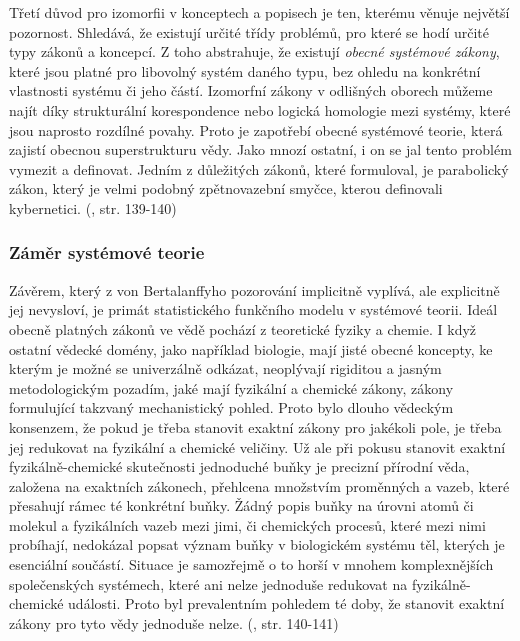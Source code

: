 \documentclass[11pt,a4paper]{article}
\begin{document}
Třetí důvod pro izomorfii v konceptech a popisech je ten, kterému věnuje největší pozornost. Shledává, že existují určité třídy problémů, pro které se hodí určité typy zákonů a koncepcí. Z toho abstrahuje, že existují \textit{obecné systémové zákony}, které jsou platné pro libovolný systém daného typu, bez ohledu na konkrétní vlastnosti systému či jeho částí. Izomorfní zákony v odlišných oborech můžeme najít díky strukturální korespondence nebo logická homologie mezi systémy, které jsou naprosto rozdílné povahy. Proto je zapotřebí obecné systémové teorie, která zajistí obecnou superstrukturu vědy. Jako mnozí ostatní, i on se jal tento problém vymezit a definovat. Jedním z důležitých zákonů, které formuloval, je parabolický zákon, který je velmi podobný zpětnovazební smyčce, kterou definovali kybernetici. (\cite{von_bertalanffy_outline_1950}, str. 139-140)


\subsubsection{Záměr systémové teorie}

Závěrem, který z von Bertalanffyho pozorování implicitně vyplívá, ale explicitně jej nevysloví, je primát statistického funkčního modelu v systémové teorii. Ideál obecně platných zákonů ve vědě pochází z teoretické fyziky a chemie. I když ostatní vědecké domény, jako například biologie, mají jisté obecné koncepty, ke kterým je možné se univerzálně odkázat, neoplývají rigiditou a jasným metodologickým pozadím, jaké mají fyzikální a chemické zákony, zákony formulující takzvaný mechanistický pohled. Proto bylo dlouho vědeckým konsenzem, že pokud je třeba stanovit exaktní zákony pro jakékoli pole, je třeba jej redukovat na fyzikální a chemické veličiny. Už ale při pokusu stanovit exaktní fyzikálně-chemické skutečnosti jednoduché buňky je precizní přírodní věda, založena na exaktních zákonech, přehlcena množstvím proměnných a vazeb, které přesahují rámec té konkrétní buňky. Žádný popis buňky na úrovni atomů či molekul a fyzikálních vazeb mezi jimi, či chemických procesů, které mezi nimi probíhají, nedokázal popsat význam buňky v biologickém systému těl, kterých je esenciální součástí. Situace je samozřejmě o to horší v mnohem komplexnějších společenských systémech, které ani nelze jednoduše redukovat na fyzikálně-chemické události. Proto byl prevalentním pohledem té doby, že stanovit exaktní zákony pro tyto vědy jednoduše nelze. (\cite{von_bertalanffy_outline_1950}, str. 140-141)
\end{document}
